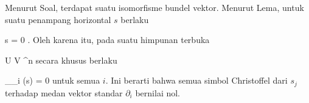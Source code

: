 Menurut
Soal,
terdapat suatu isomorfisme bundel vektor. Menurut
Lema,
untuk suatu penampang horizontal $s$ berlaku

\mavergleichskette
{\vergleichskette
{ \nabla s
}
{ = }{ 0
}
{  }{
}
{    }{
}
{   }{
}
}
{}{}{.}
Oleh karena itu, pada suatu himpunan terbuka

\mavergleichskette
{\vergleichskette
{ U
}
{ \cong }{ V
}
{ \subseteq }{  \R^n
}
{    }{
}
{   }{
}
}
{}{}{}
secara khusus berlaku

\mavergleichskettedisp
{\vergleichskette
{ \nabla_{\partial_i} (s)
}
{ =} { 0
}
{ } {
}
{ } {
}
{ } {
}
}
{}{}{}
untuk semua $i$. Ini berarti bahwa semua simbol Christoffel dari
$s_j$ terhadap medan vektor standar $\partial_i$ bernilai nol.
